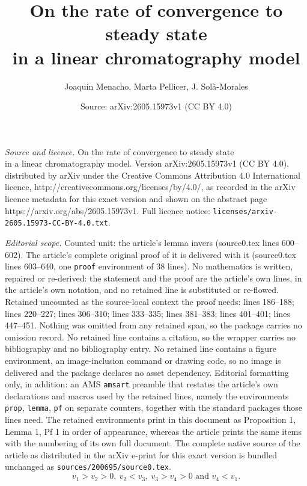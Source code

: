 \documentclass[10pt,a4paper]{amsart}
\title{On the rate of convergence to steady state\\ in a linear chromatography model}
\author{Joaqu\'in Menacho, Marta Pellicer, J. Sol\`a-Morales}
\date{Source: arXiv:2605.15973v1 (CC BY 4.0)}
\begin{document}
\maketitle

\noindent\emph{Source and licence.} On the rate of convergence to steady state\\ in a linear chromatography model. Version arXiv:2605.15973v1 (CC BY 4.0), distributed by arXiv under the Creative Commons Attribution 4.0 International licence, http://creativecommons.org/licenses/by/4.0/, as recorded in the arXiv licence metadata for this exact version and shown on the abstract page https://arxiv.org/abs/2605.15973v1. Full licence notice: \texttt{licenses/arxiv-2605.15973-CC-BY-4.0.txt}.\par\smallskip

\noindent\textit{Editorial scope.} Counted unit: the article's lemma invers (source0.tex lines 600--602). The article's complete original proof of it is delivered with it (source0.tex lines 603--640, one \texttt{proof} environment of 38 lines). No mathematics is written, repaired or re-derived: the statement and the proof are the article's own lines, in the article's own notation, and no retained line is substituted or re-flowed.  Retained uncounted as the source-local context the proof needs: lines 186--188; lines 220--227; lines 306--310; lines 333--335; lines 381--383; lines 401--401; lines 447--451.  Nothing was omitted from any retained span, so the package carries no omission record.  No retained line contains a citation, so the wrapper carries no bibliography and no bibliography entry.  No retained line contains a figure environment, an image-inclusion command or drawing code, so no image is delivered and the package declares no asset dependency.  Editorial formatting only, in addition: an AMS \texttt{amsart} preamble that restates the article's own declarations and macros used by the retained lines, namely the environments \texttt{prop}, \texttt{lemma}, \texttt{pf} on separate counters, together with the standard packages those lines need.  The retained environments print in this document as Proposition 1, Lemma 1, Pf 1 in order of appearance, whereas the article prints the same items with the numbering of its own full document.  The complete native source of the article as distributed in the arXiv e-print for this exact version is bundled unchanged as \texttt{sources/200695/source0.tex}.
\begin{equation}\label{ineq}
v_1>v_2>0, \ v_2<v_3, \ v_3>v_4>0 \text{ and } v_4<v_1.
\end{equation}
\end{document}
